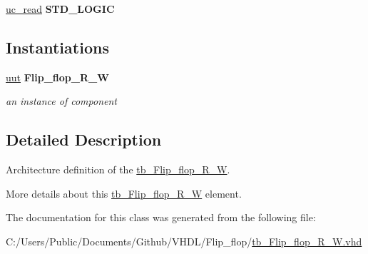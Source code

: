 \begin{DoxyCompactItemize}
\item 
\hyperlink{classtb___flip__flop___r___w_1_1_behavioral_a190dbf29a2d9cdf803fdac336c49cf66}{uc\+\_\+read} {\bfseries \textcolor{vhdlchar}{S\+T\+D\+\_\+\+L\+O\+G\+IC}\textcolor{vhdlchar}{ }} \hypertarget{classtb___flip__flop___r___w_1_1_behavioral_a190dbf29a2d9cdf803fdac336c49cf66}{}\label{classtb___flip__flop___r___w_1_1_behavioral_a190dbf29a2d9cdf803fdac336c49cf66}

\end{DoxyCompactItemize}
\subsection*{Instantiations}
 \begin{DoxyCompactItemize}
\item 
\hyperlink{classtb___flip__flop___r___w_1_1_behavioral_a1619316ad715601eb5d3559db829ac05}{uut}  {\bfseries Flip\+\_\+flop\+\_\+\+R\+\_\+W}   \hypertarget{classtb___flip__flop___r___w_1_1_behavioral_a1619316ad715601eb5d3559db829ac05}{}\label{classtb___flip__flop___r___w_1_1_behavioral_a1619316ad715601eb5d3559db829ac05}

\begin{DoxyCompactList}\small\item\em an instance of component \end{DoxyCompactList}\end{DoxyCompactItemize}


\subsection{Detailed Description}
Architecture definition of the \hyperlink{classtb___flip__flop___r___w}{tb\+\_\+\+Flip\+\_\+flop\+\_\+\+R\+\_\+W}. 

More details about this \hyperlink{classtb___flip__flop___r___w}{tb\+\_\+\+Flip\+\_\+flop\+\_\+\+R\+\_\+W} element. 

The documentation for this class was generated from the following file\+:\begin{DoxyCompactItemize}
\item 
C\+:/\+Users/\+Public/\+Documents/\+Github/\+V\+H\+D\+L/\+Flip\+\_\+flop/\hyperlink{tb___flip__flop___r___w_8vhd}{tb\+\_\+\+Flip\+\_\+flop\+\_\+\+R\+\_\+\+W.\+vhd}\end{DoxyCompactItemize}
